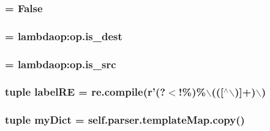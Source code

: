 \label{namespaceisa__parser_affb051454a88437b53c5cdd67419ea1c}
\hypertarget{namespaceisa__parser_a0514aabed091ee5e2f35766eb01eced6}{
\subsubsection[{debug}]{ = False}}
\label{namespaceisa__parser_a0514aabed091ee5e2f35766eb01eced6}
\hypertarget{namespaceisa__parser_ab7ff5b63e918e86c764db97b98f6101c}{
\subsubsection[{is\_\-dest}]{ = lambdaop:op.is\_\-dest}}
\label{namespaceisa__parser_ab7ff5b63e918e86c764db97b98f6101c}
\hypertarget{namespaceisa__parser_a1a1258870d1ef965556926e8c49fc793}{
\subsubsection[{is\_\-src}]{ = lambdaop:op.is\_\-src}}
\label{namespaceisa__parser_a1a1258870d1ef965556926e8c49fc793}
\hypertarget{namespaceisa__parser_a9080638e0d8d120d2aabf434965f7124}{
\subsubsection[{labelRE}]{\setlength{\rightskip}{0pt plus 5cm}tuple {\bf labelRE} = re.compile(r'(?$<$!\%)\%$\backslash$((\mbox{[}$^\wedge$$\backslash$)\mbox{]}+)$\backslash$)}}
\label{namespaceisa__parser_a9080638e0d8d120d2aabf434965f7124}
\hypertarget{namespaceisa__parser_a5e9a69b632504688c1674beaebcc950f}{
\subsubsection[{myDict}]{\setlength{\rightskip}{0pt plus 5cm}tuple {\bf myDict} = self.parser.templateMap.copy()}}
